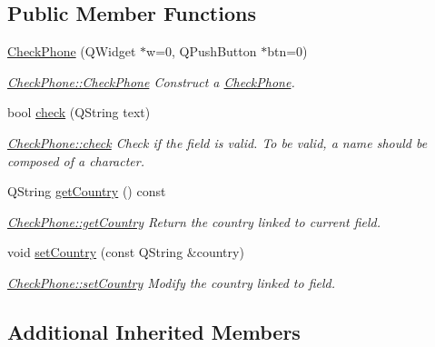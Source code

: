 \subsection*{Public Member Functions}
\begin{DoxyCompactItemize}
\item 
\hyperlink{classGui_1_1Widgets_1_1CheckFields_1_1CheckPhone_ac7103ecce21d8d55ecf46c403eb4b625}{Check\+Phone} (Q\+Widget $\ast$w=0, Q\+Push\+Button $\ast$btn=0)
\begin{DoxyCompactList}\small\item\em \hyperlink{classGui_1_1Widgets_1_1CheckFields_1_1CheckPhone_ac7103ecce21d8d55ecf46c403eb4b625}{Check\+Phone\+::\+Check\+Phone} Construct a \hyperlink{classGui_1_1Widgets_1_1CheckFields_1_1CheckPhone}{Check\+Phone}. \end{DoxyCompactList}\item 
bool \hyperlink{classGui_1_1Widgets_1_1CheckFields_1_1CheckPhone_a15e8da6b25e752c6fb816e6655bdb062}{check} (Q\+String text)
\begin{DoxyCompactList}\small\item\em \hyperlink{classGui_1_1Widgets_1_1CheckFields_1_1CheckPhone_a15e8da6b25e752c6fb816e6655bdb062}{Check\+Phone\+::check} Check if the field is valid. To be valid, a name should be composed of a character. \end{DoxyCompactList}\item 
Q\+String \hyperlink{classGui_1_1Widgets_1_1CheckFields_1_1CheckPhone_ae68d979332fba8523ec69a7e85790ed6}{get\+Country} () const 
\begin{DoxyCompactList}\small\item\em \hyperlink{classGui_1_1Widgets_1_1CheckFields_1_1CheckPhone_ae68d979332fba8523ec69a7e85790ed6}{Check\+Phone\+::get\+Country} Return the country linked to current field. \end{DoxyCompactList}\item 
void \hyperlink{classGui_1_1Widgets_1_1CheckFields_1_1CheckPhone_ac59318e7efa5616389b9eb3a55daaead}{set\+Country} (const Q\+String \&country)
\begin{DoxyCompactList}\small\item\em \hyperlink{classGui_1_1Widgets_1_1CheckFields_1_1CheckPhone_ac59318e7efa5616389b9eb3a55daaead}{Check\+Phone\+::set\+Country} Modify the {\itshape country} linked to field. \end{DoxyCompactList}\end{DoxyCompactItemize}
\subsection*{Additional Inherited Members}


